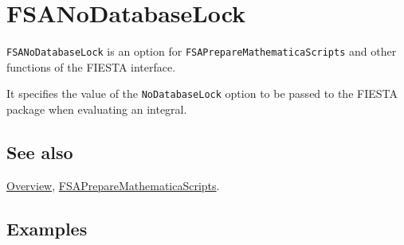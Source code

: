 \documentclass[../FeynHelpersManual.tex]{subfiles}
\begin{document}
\hypertarget{fsanodatabaselock}{
\section{FSANoDatabaseLock}\label{fsanodatabaselock}}

\texttt{FSANoDatabaseLock} is an option for
\texttt{FSAPrepareMathematicaScripts} and other functions of the FIESTA
interface.

It specifies the value of the \texttt{NoDatabaseLock} option to be
passed to the FIESTA package when evaluating an integral.

\subsection{See also}

\hyperlink{toc}{Overview},
\hyperlink{fsapreparemathematicascripts}{FSAPrepareMathematicaScripts}.

\subsection{Examples}
\end{document}
